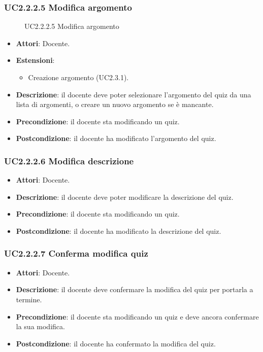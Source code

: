 \subsubsection{UC2.2.2.5 Modifica argomento}
\begin{figure}[H]
\centering
\noindent{}
\caption{UC2.2.2.5 Modifica argomento}
\end{figure}
\begin{itemize}
\item \textbf{Attori}: Docente.
\item \textbf{Estensioni}:
\begin{itemize}
\item Creazione argomento (UC2.3.1).
\end{itemize}
\item \textbf{Descrizione}: il docente deve poter selezionare l'argomento del quiz da una lista di argomenti, o creare un nuovo argomento se è mancante.
\item \textbf{Precondizione}: il docente sta modificando un quiz.
\item \textbf{Postcondizione}: il docente ha modificato l'argomento del quiz.
\end{itemize}
\subsubsection{UC2.2.2.6 Modifica descrizione}
\begin{itemize}
\item \textbf{Attori}: Docente.
\item \textbf{Descrizione}: il docente deve poter modificare la descrizione del quiz.
\item \textbf{Precondizione}: il docente sta modificando un quiz.
\item \textbf{Postcondizione}: il docente ha modificato la descrizione del quiz.
\end{itemize}
\subsubsection{UC2.2.2.7 Conferma modifica quiz}
\begin{itemize}
\item \textbf{Attori}: Docente.
\item \textbf{Descrizione}: il docente deve confermare la modifica del quiz per portarla a termine.
\item \textbf{Precondizione}: il docente sta modificando un quiz e deve ancora confermare la sua modifica.
\item \textbf{Postcondizione}: il docente ha confermato la modifica del quiz.
\end{itemize}
